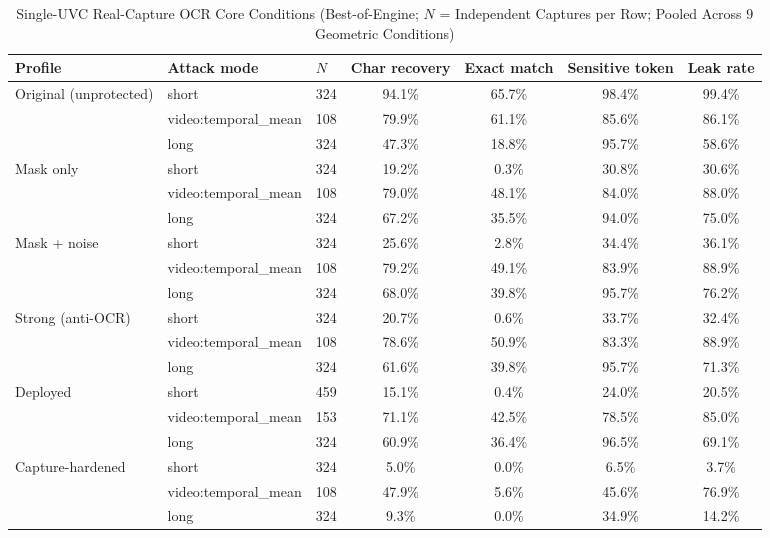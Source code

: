\documentclass{ieeeaccess}
\begin{document}
\begin{table}[!t]
\caption{Single-UVC Real-Capture OCR Core Conditions (Best-of-Engine; $N$ = Independent Captures per Row; Pooled Across 9 Geometric Conditions)}
\label{tab:real_ocr_main}
\centering
\begin{tabular}{lllcccc}
\toprule
Profile & Attack mode & $N$ & Char recovery & Exact match & Sensitive token & Leak rate \\
\midrule
\multirow{3}{*}{Original (unprotected)}
 & short & 324 & 94.1\% & 65.7\% & 98.4\% & 99.4\% \\
 & video:temporal\_mean & 108 & 79.9\% & 61.1\% & 85.6\% & 86.1\% \\
 & long & 324 & 47.3\% & 18.8\% & 95.7\% & 58.6\% \\
\midrule
\multirow{3}{*}{Mask only}
 & short & 324 & 19.2\% & 0.3\% & 30.8\% & 30.6\% \\
 & video:temporal\_mean & 108 & 79.0\% & 48.1\% & 84.0\% & 88.0\% \\
 & long & 324 & 67.2\% & 35.5\% & 94.0\% & 75.0\% \\
\midrule
\multirow{3}{*}{Mask + noise}
 & short & 324 & 25.6\% & 2.8\% & 34.4\% & 36.1\% \\
 & video:temporal\_mean & 108 & 79.2\% & 49.1\% & 83.9\% & 88.9\% \\
 & long & 324 & 68.0\% & 39.8\% & 95.7\% & 76.2\% \\
\midrule
\multirow{3}{*}{Strong (anti-OCR)}
 & short & 324 & 20.7\% & 0.6\% & 33.7\% & 32.4\% \\
 & video:temporal\_mean & 108 & 78.6\% & 50.9\% & 83.3\% & 88.9\% \\
 & long & 324 & 61.6\% & 39.8\% & 95.7\% & 71.3\% \\
\midrule
\multirow{3}{*}{Deployed}
 & short & 459 & 15.1\% & 0.4\% & 24.0\% & 20.5\% \\
 & video:temporal\_mean & 153 & 71.1\% & 42.5\% & 78.5\% & 85.0\% \\
 & long & 324 & 60.9\% & 36.4\% & 96.5\% & 69.1\% \\
\midrule
\multirow{3}{*}{Capture-hardened}
 & short & 324 & 5.0\% & 0.0\% & 6.5\% & 3.7\% \\
 & video:temporal\_mean & 108 & 47.9\% & 5.6\% & 45.6\% & 76.9\% \\
 & long & 324 & 9.3\% & 0.0\% & 34.9\% & 14.2\% \\
\bottomrule
\end{tabular}
\end{table}
\end{document}
